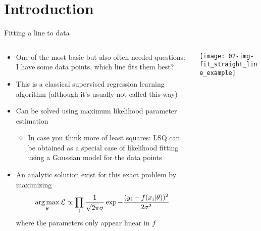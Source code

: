

\subtitle{Part II -- Machine Learning Basics\\\vspace*{1.5ex}
  \small \textbf{Goal:} Gain basic understanding on why we need machine learning, what the differences between the many algorithms is and get introduced to some popular approaches
}


  
  \maketitle

\section{Introduction}

  \begin{frame}{Fitting a line to data}
    \begin{columns}
      \begin{column}{0.5\textwidth}
        \begin{itemize}
          \item One of the most basic but also often needed questions: I have some data points, which line fits them best?
          \item This is a classical supervised regression learning algorithm (although it's usually not called this way)
          \item Can be solved using maximum likelihood parameter estimation
          \begin{itemize}
            \item In case you think more of least squares: LSQ can be obtained as a special case of likelihood fitting using a Gaussian model for the data points
          \end{itemize}
          \item An analytic solution exist for this exact problem by maximizing
          \begin{equation*}
            \operatorname*{arg\,max}_{\theta}\mathcal{L} \propto \prod_i
              \frac{1}{\sqrt{2\pi}\sigma}
              \exp{-\frac{(y_i - f(x_i|\theta))^2}{2\sigma^2}}
          \end{equation*}
          where the parameters only appear linear in $f$
        \end{itemize}
      \end{column}

      \begin{column}{0.5\textwidth}
        \texttt{[image: 02-img-fit\_straight\_line\_example]}
      \end{column}

    \end{columns}
  \end{frame}

